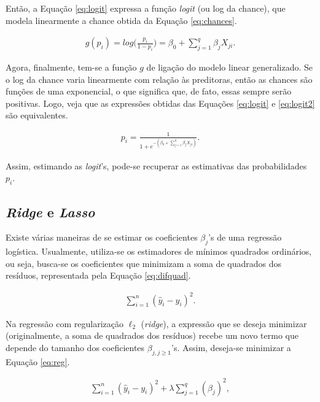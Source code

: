 \documentclass[
  12pt,
]{article}
\begin{document}
\quad Então, a Equação \ref{eq:logit} expressa a função \emph{logit} (ou
log da chance), que modela linearmente a chance obtida da Equação
\ref{eq:chances}.

\begin{eqnarray}
\label{eq:logit}
g(p_i)= log \Big( \frac{p_i}{1 - p_i} \Big) = \beta_0 + \sum_{j=1}^q  \beta_j X_{ji}.
\end{eqnarray}

\quad Agora, finalmente, tem-se a função \(g\) de ligação do modelo
linear generalizado. Se o log da chance varia linearmente com relação às
preditoras, então as chances são funções de uma exponencial, o que
significa que, de fato, essas sempre serão positivas. Logo, veja que as
expressões obtidas das Equações \ref{eq:logit} e \ref{eq:logit2} são
equivalentes.

\begin{eqnarray}
\label{eq:logit2}
p_i = \frac{1}{1 + e^{-(\beta_0 + \sum_{j=1}^q  \beta_j X_{ji})}}.
\end{eqnarray}

\quad Assim, estimando as \emph{logit}'s, pode-se recuperar as
estimativas das probabilidades \(p_i\).

\subsection{\textit{Ridge} e \textit{Lasso}}

\quad Existe várias maneiras de se estimar os coeficientes \(\beta_j\)'s
de uma regressão logística. Usualmente, utiliza-se os estimadores de
mínimos quadrados ordinários, ou seja, busca-se os coeficientes que
minimizam a soma de quadrados dos resíduos, representada pela Equação
\ref{eq:difquad}.

\begin{eqnarray}
\label{eq:difquad}
\sum_{i=1}^{n}(\hat{y}_i - y_i)^2.
\end{eqnarray}

\quad Na regressão com regularização \(\ell_2\) (\emph{ridge}), a
expressão que se deseja minimizar (originalmente, a soma de quadrados
dos resíduos) recebe um novo termo que depende do tamanho dos
coeficientes \(\beta_{j, j \geq 1}\)'s. Assim, deseja-se minimizar a
Equação \ref{eq:reg}.

\begin{eqnarray}
\label{eq:reg}
\sum_{i=1}^{n}(\hat{y}_i - y_i)^2 + \lambda \sum_{j=1}^{q}(\beta_j)^2,
\end{eqnarray}
\end{document}
